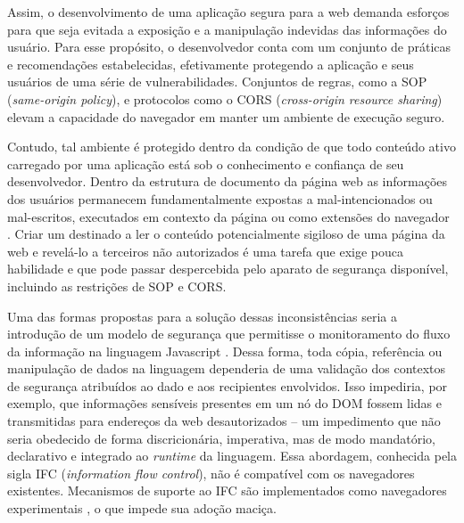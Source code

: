 Assim, o desenvolvimento de uma aplicação segura para a web demanda esforços para que seja evitada a exposição e a manipulação indevidas das informações do usuário. Para esse propósito, o desenvolvedor conta com um conjunto de práticas e recomendações estabelecidas, efetivamente protegendo a aplicação e seus usuários de uma série de vulnerabilidades. Conjuntos de regras, como a SOP (\textit{same-origin policy}), e protocolos como o CORS (\textit{cross-origin resource sharing}) elevam a capacidade do navegador em manter um ambiente de execução seguro.%

Contudo, tal ambiente é protegido dentro da condição de que todo conteúdo ativo carregado por uma aplicação está sob o conhecimento e confiança de seu desenvolvedor. Dentro da estrutura de documento da página web as informações dos usuários permanecem fundamentalmente expostas a \scripts mal-intencionados ou mal-escritos, executados em contexto da página ou como extensões do navegador \cite{Heule2015_Most_Dangerous_Code}. Criar um \script destinado a ler o conteúdo potencialmente sigiloso de uma página da web e revelá-lo a terceiros não autorizados é uma tarefa que exige pouca habilidade e que pode passar despercebida pelo aparato de segurança disponível, incluindo as restrições de SOP e CORS.

Uma das formas propostas para a solução dessas inconsistências seria a introdução de um modelo de segurança que permitisse o monitoramento do fluxo da informação na linguagem Javascript \cite[p.3]{Heule2015_IFC_Inside}. Dessa forma, toda cópia, referência ou manipulação de dados na linguagem dependeria de uma validação dos contextos de segurança atribuídos ao dado e aos recipientes envolvidos. Isso impediria, por exemplo, que informações sensíveis presentes em um nó do DOM fossem lidas e transmitidas para endereços da web desautorizados -- um impedimento que não seria obedecido de forma discricionária, imperativa, mas de modo mandatório, declarativo e integrado ao \textit{runtime} da linguagem. Essa abordagem, conhecida pela sigla IFC (\textit{information flow control}), não é compatível com os navegadores existentes. Mecanismos de suporte ao IFC são implementados como navegadores experimentais \cite{Hedin2014, Bichhawat2014}, o que impede sua adoção maciça.

